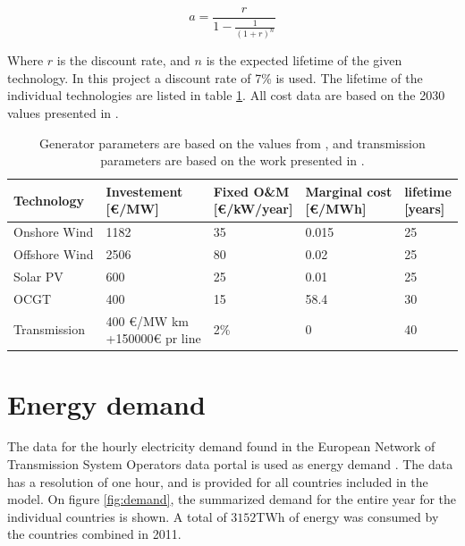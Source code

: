 \begin{equation}\label{eq:annuity}
a = \frac{r}{1 - \frac{1}{(1+r)^n}}
\end{equation}

Where $r$ is the discount rate, and $n$ is the expected lifetime of the given technology. In this project a discount rate of 7\% \cite{PyPSA_euro_30_model} is used. The lifetime of the individual technologies are listed in table \ref{tab:cost_data}. All cost data are based on the 2030 values presented in \cite{Schroder2013Current}.

\begin{table}[]
	\begin{tabular}{l|llll}
		Technology      & \makecell[c]{Investement \\ {[}€/MW{]}}	& \makecell[c]{Fixed O\&M \\ {[}€/kW/year{]}} & \makecell[c]{Marginal cost \\ {[}€/MWh{]}}	& \makecell[c]{lifetime \\ {[}years{]}} \\ \hline
		Onshore Wind    &       1182  		&   35      &   0.015       &   25       \\
		Offshore Wind	&		2506		&	80		&	0.02		&	25		\\
		Solar PV   		&       600    		&   25      &   0.01    	&   25       \\
		OCGT       		&       400    		&   15      &   58.4        &   30      \\
		Transmission	&   \makecell[l]{ 400 €/MW km \\ +150000€ pr line}  & 2\% & 0 		&   40 
	\end{tabular}
	\caption{Generator parameters are based on the values from \cite{Schroder2013Current}, and transmission parameters are based on the work presented in \cite{HAGSPIEL2014654}.}
	\label{tab:cost_data}
\end{table}

\section{Energy demand}
The data for the hourly electricity demand found in the European Network of Transmission System Operators data portal is used as energy demand \cite{ENTSO-E}. The data has a resolution of one hour, and is provided for all countries included in the model. On figure \ref{fig:demand}, the summarized demand for the entire year for the individual countries is shown. A total of $3152$TWh of energy was consumed by the countries combined in 2011. 


